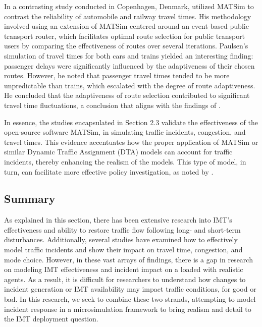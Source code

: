 \documentclass[
  letterpaper,
  authoryear]{elsarticle}
\begin{document}
In a contrasting study conducted in Copenhagen, Denmark,
\citet{paulsen2018} utilized MATSim to contrast the reliability of
automobile and railway travel times. His methodology involved using an
extension of MATSim centered around an event-based public transport
router, which facilitates optimal route selection for public transport
users by comparing the effectiveness of routes over several iterations.
Paulsen's simulation of travel times for both cars and trains yielded an
interesting finding: passenger delays were significantly influenced by
the adaptiveness of their chosen routes. However, he noted that
passenger travel times tended to be more unpredictable than trains,
which escalated with the degree of route adaptiveness. He concluded that
the adaptiveness of route selection contributed to significant travel
time fluctuations, a conclusion that aligns with the findings of
\citet{li2020}.

In essence, the studies encapsulated in Section 2.3 validate the
effectiveness of the open-source software MATSim, in simulating traffic
incidents, congestion, and travel times. This evidence accentuates how
the proper application of MATSim or similar Dynamic Traffic Assignment
(DTA) models can account for traffic incidents, thereby enhancing the
realism of the models. This type of model, in turn, can facilitate more
effective policy investigation, as noted by \citet{kaddoura2018}.

\hypertarget{summary}{%
\subsection{Summary}\label{summary}}

As explained in this section, there has been extensive research into
IMT's effectiveness and ability to restore traffic flow following long-
and short-term disturbances. Additionally, several studies have examined
how to effectively model traffic incidents and show their impact on
travel time, congestion, and mode choice. However, in these vast arrays
of findings, there is a gap in research on modeling IMT effectiveness
and incident impact on a loaded with realistic agents. As a result, it
is difficult for researchers to understand how changes to incident
generation or IMT availability may impact traffic conditions, for good
or bad. In this research, we seek to combine these two strands,
attempting to model incident response in a microsimulation framework to
bring realism and detail to the IMT deployment question.
\end{document}

